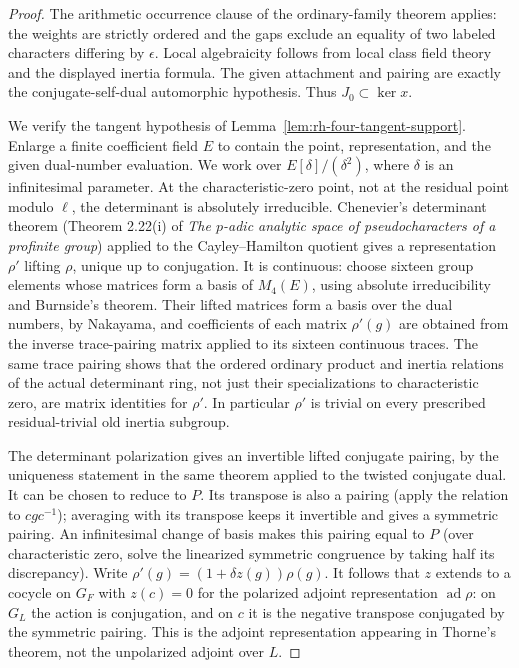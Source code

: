 \begin{proof}
The arithmetic occurrence clause of the ordinary-family theorem
applies: the weights are strictly ordered and the gaps exclude an
equality of two labeled characters differing by $\epsilon$.
Local algebraicity follows from local class field theory and the
displayed inertia formula. The given attachment and pairing are
exactly the conjugate-self-dual automorphic hypothesis. Thus
$J_0\subset\ker x$.

We verify the tangent hypothesis of Lemma~\ref{lem:rh-four-tangent-support}.
Enlarge a finite coefficient field $E$ to contain the point,
representation, and the given dual-number evaluation. We work over
$E[\delta]/(\delta^2)$, where $\delta$ is an infinitesimal parameter.
At the characteristic-zero point, not at the residual point modulo
$\ell$, the determinant is absolutely irreducible. Chenevier's
determinant theorem (Theorem 2.22(i) of \emph{The $p$-adic analytic
space of pseudocharacters of a profinite group}) applied to the
Cayley--Hamilton quotient gives a representation $\rho'$ lifting
$\rho$, unique up to conjugation. It is continuous: choose sixteen
group elements whose matrices form a basis of $M_4(E)$, using
absolute irreducibility and Burnside's theorem. Their lifted matrices
form a basis over the dual numbers, by Nakayama, and coefficients of
each matrix $\rho'(g)$ are obtained from the inverse trace-pairing
matrix applied to its sixteen continuous traces. The same trace
pairing shows that the ordered ordinary product and inertia
relations of the actual determinant ring, not just their
specializations to characteristic zero, are matrix identities for
$\rho'$. In particular $\rho'$ is trivial on every prescribed
residual-trivial old inertia subgroup.

The determinant polarization gives an invertible lifted conjugate
pairing, by the uniqueness statement in the same theorem applied to
the twisted conjugate dual. It can be chosen to reduce to $P$.
Its transpose is also a pairing (apply the relation to $cgc^{-1}$);
averaging with its transpose keeps it invertible and gives a symmetric
pairing. An infinitesimal change of basis makes this pairing equal
to $P$ (over characteristic zero, solve the linearized symmetric
congruence by taking half its discrepancy). Write
$\rho'(g)=(1+\delta z(g))\rho(g)$. It follows that $z$ extends to a
cocycle on $G_F$ with $z(c)=0$ for the polarized adjoint
representation $\operatorname{ad}\rho$: on $G_L$ the action is
conjugation, and on $c$ it is the negative transpose conjugated by
the symmetric pairing. This is the adjoint representation appearing
in Thorne's theorem, not the unpolarized adjoint over $L$.


\end{proof}

